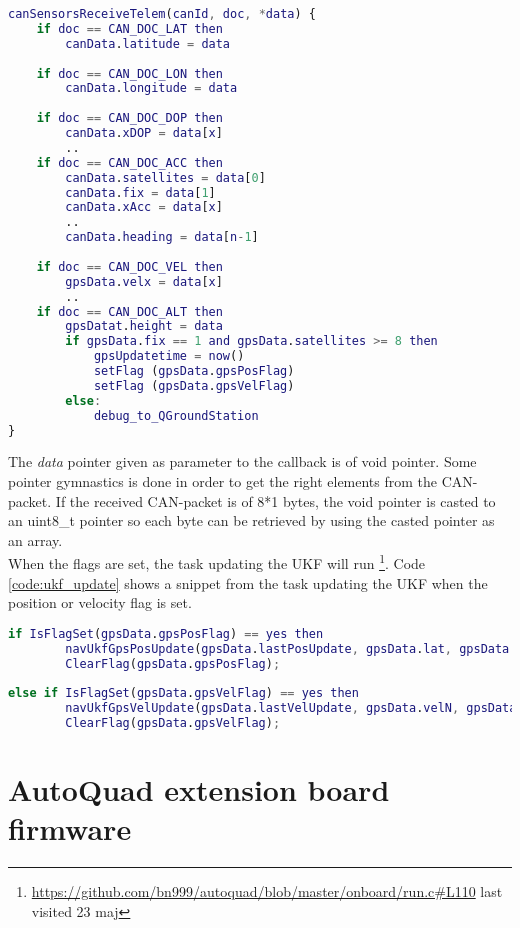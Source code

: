 \begin{lstlisting}[language = Matlab, caption = Modified callback invoked when a sensor-value is received. Shows how doc is used to tell which GPS\-packet is received and when height is received the flags are set, label=code:psudo_parse_can_gps]
canSensorsReceiveTelem(canId, doc, *data) {
	if doc == CAN_DOC_LAT then
		canData.latitude = data
		
	if doc == CAN_DOC_LON then
		canData.longitude = data
		
	if doc == CAN_DOC_DOP then
		canData.xDOP = data[x]
		..
	if doc == CAN_DOC_ACC then
		canData.satellites = data[0]
		canData.fix = data[1]
		canData.xAcc = data[x]
		..
		canData.heading = data[n-1]
		
	if doc == CAN_DOC_VEL then
		gpsData.velx = data[x]
		..		
	if doc == CAN_DOC_ALT then
		gpsDatat.height = data
		if gpsData.fix == 1 and gpsData.satellites >= 8 then
			gpsUpdatetime = now()
			setFlag (gpsData.gpsPosFlag)
			setFlag (gpsData.gpsVelFlag)
		else:
			debug_to_QGroundStation
}
\end{lstlisting}

The \textit{data} pointer given as parameter to the callback is of void pointer. Some pointer gymnastics is done in order to get the right elements from the CAN-packet. If the received CAN-packet is of 8*1 bytes, the void pointer is casted to an uint8\_t pointer so each byte can be retrieved by using the casted pointer as an array. \\

When the flags are set, the task updating the UKF will run \footnote{\url{https://github.com/bn999/autoquad/blob/master/onboard/run.c\#L110} last visited 23 maj}.
Code \ref{code:ukf_update} shows a snippet from the task updating the UKF when the position or velocity flag is set.
\begin{lstlisting}[language = Matlab, caption = Snippet of run.c as psudeocode which updates the UKF when position flag or velocity flag is set, label=code:ukf_update]
if IsFlagSet(gpsData.gpsPosFlag) == yes then
	    navUkfGpsPosUpdate(gpsData.lastPosUpdate, gpsData.lat, gpsData.lon, gpsData.height, ....);
	    ClearFlag(gpsData.gpsPosFlag);
	    
else if IsFlagSet(gpsData.gpsVelFlag) == yes then
	    navUkfGpsVelUpdate(gpsData.lastVelUpdate, gpsData.velN, gpsData.velE, ....);
	    ClearFlag(gpsData.gpsVelFlag);
\end{lstlisting}

\section{AutoQuad extension board firmware}


